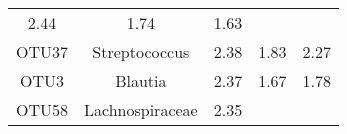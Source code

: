 \documentclass[12pt,]{article}
\begin{document}
\begin{longtable}[]{@{}ccccc@{}}
\begin{minipage}[t]{0.17\columnwidth}
2.44\strut
\end{minipage} & \begin{minipage}[t]{0.25\columnwidth}\centering\strut
1.74\strut
\end{minipage} & \begin{minipage}[t]{0.19\columnwidth}\centering\strut
1.63\strut
\end{minipage}\tabularnewline
\begin{minipage}[t]{0.07\columnwidth}\centering\strut
OTU37\strut
\end{minipage} & \begin{minipage}[t]{0.18\columnwidth}\centering\strut
Streptococcus\strut
\end{minipage} & \begin{minipage}[t]{0.17\columnwidth}\centering\strut
2.38\strut
\end{minipage} & \begin{minipage}[t]{0.25\columnwidth}\centering\strut
1.83\strut
\end{minipage} & \begin{minipage}[t]{0.19\columnwidth}\centering\strut
2.27\strut
\end{minipage}\tabularnewline
\begin{minipage}[t]{0.07\columnwidth}\centering\strut
OTU3\strut
\end{minipage} & \begin{minipage}[t]{0.18\columnwidth}\centering\strut
Blautia\strut
\end{minipage} & \begin{minipage}[t]{0.17\columnwidth}\centering\strut
2.37\strut
\end{minipage} & \begin{minipage}[t]{0.25\columnwidth}\centering\strut
1.67\strut
\end{minipage} & \begin{minipage}[t]{0.19\columnwidth}\centering\strut
1.78\strut
\end{minipage}\tabularnewline
\begin{minipage}[t]{0.07\columnwidth}\centering\strut
OTU58\strut
\end{minipage} & \begin{minipage}[t]{0.18\columnwidth}\centering\strut
Lachnospiraceae\strut
\end{minipage} & \begin{minipage}[t]{0.17\columnwidth}\centering\strut
2.35\strut
\end{minipage} & \begin{minipage}[t]{0.25\columnwidth}\centering\strut

\end{minipage}
\end{longtable}
\end{document}
